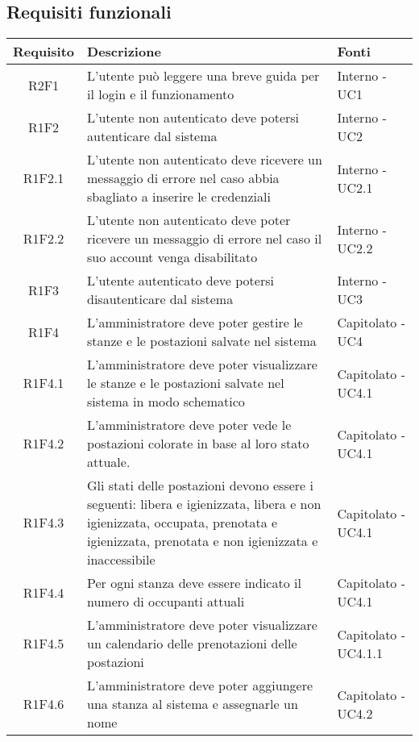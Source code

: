 \subsection{Requisiti funzionali}
\begin{center}
	\begin{longtable}{|c|p{10cm}|p{4cm}|}
		\hline
		\rowcolor{lighter-grayer}
		\textbf{Requisito} & \textbf{Descrizione} & \textbf{Fonti}  \\
		\hline
		\endhead
		
		 R2F1 & L'utente può leggere una breve guida per il login e il funzionamento & Interno - UC1 \\
		\hline
		R1F2	&	L'utente non autenticato deve potersi autenticare dal sistema& Interno - UC2	\\
		\hline
		R1F2.1	&	L'utente non autenticato deve ricevere un messaggio di errore nel caso abbia sbagliato a inserire le credenziali& Interno - UC2.1	\\
		\hline
		R1F2.2	&	L'utente non autenticato deve poter ricevere un messaggio di errore nel caso il suo account venga disabilitato& Interno - UC2.2	\\
		\hline
		R1F3	&	L'utente autenticato deve potersi disautenticare dal sistema& Interno - UC3	\\
		\hline
			R1F4&L'amministratore deve poter gestire le stanze e le postazioni salvate nel sistema	& Capitolato - UC4	\\
					\hline
			R1F4.1&L'amministratore deve poter visualizzare le stanze e le postazioni salvate nel sistema in modo schematico	& Capitolato - UC4.1	\\
					\hline
			R1F4.2&	L'amministratore deve poter vede le postazioni colorate in base al loro stato attuale.& Capitolato - UC4.1	\\
					\hline
			R1F4.3&	Gli stati delle postazioni devono essere i seguenti: libera e igienizzata, libera e non igienizzata, occupata, prenotata e igienizzata, prenotata e non igienizzata e inaccessibile& 	Capitolato - UC4.1\\
					\hline
			R1F4.4&Per ogni stanza deve essere indicato il numero di occupanti attuali	& Capitolato - UC4.1	\\
					\hline
			R1F4.5&L'amministratore deve poter visualizzare un calendario delle prenotazioni delle postazioni	& Capitolato - UC4.1.1	\\
					\hline
				R1F4.6&L'amministratore deve poter aggiungere una stanza al sistema e assegnarle un nome	& Capitolato - UC4.2	\\

\end{longtable}
\end{center}

